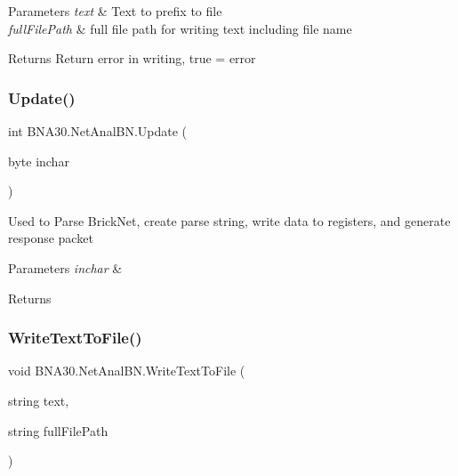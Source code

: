 \begin{DoxyParams}{Parameters}
{\em text} & Text to prefix to file\\
\hline
{\em full\+File\+Path} & full file path for writing text including file name\\
\hline
\end{DoxyParams}
\begin{DoxyReturn}{Returns}
Return error in writing, true = error 
\end{DoxyReturn}
\mbox{\label{class_b_n_a30_1_1_net_anal_b_n_ae51c43374cfe3a7fd258b31ae0602a47}} 
\subsubsection{\texorpdfstring{Update()}{Update()}}
{\footnotesize\ttfamily int B\+N\+A30.\+Net\+Anal\+B\+N.\+Update (\begin{DoxyParamCaption}\item[{byte}]{inchar }\end{DoxyParamCaption})\hspace{0.3cm}{\ttfamily [inline]}}



Used to Parse Brick\+Net, create parse string, write data to registers, and generate response packet 


\begin{DoxyParams}{Parameters}
{\em inchar} & \\
\hline
\end{DoxyParams}
\begin{DoxyReturn}{Returns}

\end{DoxyReturn}
\mbox{\label{class_b_n_a30_1_1_net_anal_b_n_a16017636e9d3a76d33def5f22454953c}} 
\subsubsection{\texorpdfstring{WriteTextToFile()}{WriteTextToFile()}}
{\footnotesize\ttfamily void B\+N\+A30.\+Net\+Anal\+B\+N.\+Write\+Text\+To\+File (\begin{DoxyParamCaption}\item[{string}]{text,  }\item[{string}]{full\+File\+Path }\end{DoxyParamCaption})\hspace{0.3cm}{\ttfamily [inline]}}



